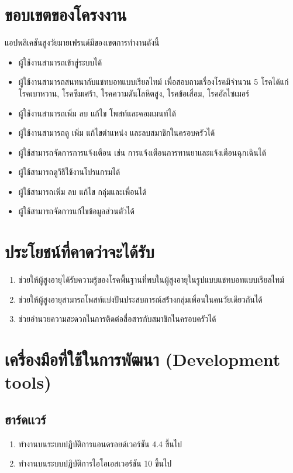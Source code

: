 \section{ขอบเขตของโครงงาน}
แอปพลิเคชันสูงวัยมายเฟรนด์มีของเขตการทำงานดังนี้
\begin{itemize}
		\item ผู้ใช้งานสามารถเข้าสู่ระบบได้
		\item ผู้ใช้งานสามารถสนทนากับแชทบอทแบบเรียลไทม์ เพื่อสอบถามเรื่องโรคมีจำนวน 5 โรคได้แก่ โรคเบาหวาน, โรคซึมเศร้า, โรคความดันโลหิตสูง, โรคข้อเสื่อม, โรคอัลไซเมอร์
		\item ผู้ใช้งานสามารถเพิ่ม ลบ แก้ไข โพสท์และคอมเมนท์ได้
		\item ผู้ใช้งานสามารถดู เพิ่ม แก้ไขตำแหน่ง และลบสมาชิกในครอบครัวได้
		\item ผู้ใช้สามารถจัดการการแจ้งเตือน เช่น การแจ้งเตือนการทานยาและแจ้งเตือนฉุกเฉินได้
		\item ผู้ใช้สามารถดูวิธีใช้งานโปรแกรมได้
		\item ผู้ใช้สามารถเพิ่ม ลบ แก้ไข กลุ่มและเพื่อนได้
		\item ผู้ใช้สามารถจัดการแก้ไขข้อมูลส่วนตัวได้
\end{itemize}
\section{ประโยชน์ที่คาดว่าจะได้รับ}
\begin{enumerate}[label=\arabic*]
	\item ช่วยให้ผู้สูงอายุได้รับความรู้ของโรคพื้นฐานที่พบในผู้สูงอายุในรูปแบบแชทบอทแบบเรียลไทม์
	\item ช่วยให้ผู้สูงอายุสามารถโพสท์แบ่งปันประสบการณ์สร้้างกลุ่มเพื่อนในคนวัยเดียวกันได้
	\item ช่วยอำนวยความสะดวกในการติดต่อสื่อสารกับสมาชิกในครอบครัวได้
\end{enumerate}
\section{เครื่องมือที่ใช้ในการพัฒนา (Development tools)}
\subsection{ฮาร์ดเเวร์}
\begin{enumerate}
			\item ทำงานบนระบบปฏิบัติการแอนดรอยด์เวอร์ชัน 4.4 ขึ้นไป
			\item ทำงานบนระบบปฏิบัติการไอโอเอสเวอร์ชัน 10 ขึ้นไป
\end{enumerate}


